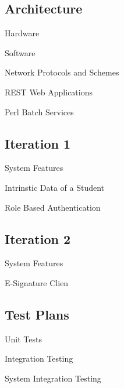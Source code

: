 \documentclass{beamer}
\begin{document}
\subsection{Architecture}
\begin{frame}{Hardware}
\end{frame}
\begin{frame}{Software}
\end{frame}
\begin{frame}{Network Protocols and Schemes}
\end{frame}
\begin{frame}{ REST Web Applications}
\end{frame}
\begin{frame}{Perl Batch Services}
\end{frame}

\subsection{Iteration 1}
\begin{frame}{System Features}
\end{frame}
\begin{frame}{Intrinstic Data of a Student}
\end{frame}
\begin{frame}{Role Based Authentication}
\end{frame}

\subsection{Iteration 2}
\begin{frame}{System Features}
\end{frame}
\begin{frame}{E-Signature Clien}
\end{frame}

\subsection{Test Plans}
\begin{frame}{Unit Tests}
\end{frame}
\begin{frame}{Integration Testing}
\end{frame}
\begin{frame}{System Integration Testing}
\end{frame}
\end{document}
